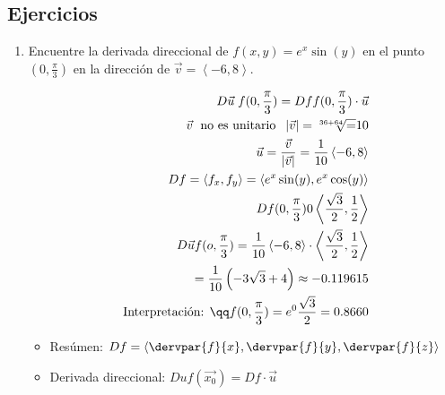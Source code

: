 \subsection{Ejercicios}
\begin{enumerate}
    \item Encuentre la derivada direccional de $f(x,y)=e^x\sin(y)$ en el punto $(0,\frac{\pi }{3} )$ en la dirección de $\vec{v}= \left\langle -6,8 \right\rangle $.
        \begin{center}
           \begin{align*}
               D\vec{u}\; f(0,\frac{\pi }{3} ) = Dff(0,\frac{\pi }{3} )\cdot \vec{u} \\ 
               \vec{v} \; \text{ no es unitario } \;  \left| \vec{v} \right| = \sqrt[36+64] = 10 \\ 
               \vec{u} = \frac{\vec{v}}{\left| \vec{v} \right| } = \frac{1}{10} \left\langle -6,8 \right\rangle \\ 
               Df = \left\langle f_x,f_y \right\rangle = \left\langle e^x\sin(y),e^x\cos(y) \right\rangle \\ 
               Df(0,\frac{\pi }{3}) 0 \left\langle \frac{\sqrt{3}}{2},\frac{1}{2} \right\rangle \\ 
               D\vec{u} f(o,\frac{\pi }{3} ) = \frac{1}{10} \left\langle -6,8 \right\rangle \cdot \left\langle \frac{\sqrt{3}}{2} , \frac{1}{2}  \right\rangle \\ 
               = \frac{1}{10} \left(-3\sqrt{3}+4\right)\approx -0.119615 \\ 
               \text{ Interpretación:  } \qq f(0,\frac{\pi }{3} ) = e^0 \frac{\sqrt{3}}{2} = 0.8660 \\ 
           \end{align*}
           \begin{itemize}
               \item Resúmen: $\displaystyle Df = \left\langle \dervpar{f}{x} , \dervpar{f}{y} , \dervpar{f}{z}  \right\rangle $ \\ 
               \item Derivada direccional: $\displaystyle Du f(\vec{x_0}) = Df\cdot \vec{u} $
           \end{itemize}
        \end{center}
    

\end{enumerate}
